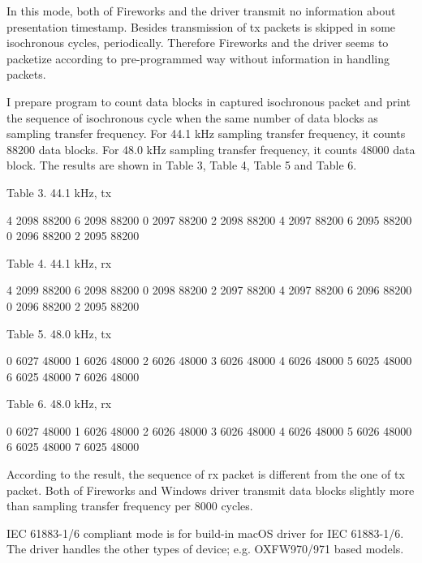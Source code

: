 In this mode, both of Fireworks and the driver transmit no information about presentation timestamp. Besides transmission of tx packets is skipped in some isochronous cycles, periodically. Therefore Fireworks and the driver seems to packetize according to pre-programmed way without information in handling packets.

I prepare program to count data blocks in captured isochronous packet and print the sequence of isochronous cycle when the same number of data blocks as sampling transfer frequency. For 44.1 kHz sampling transfer frequency, it counts 88200 data blocks. For 48.0 kHz sampling transfer frequency, it counts 48000 data block. The results are shown in Table 3, Table 4, Table 5 and Table 6.

Table 3. 44.1 kHz, tx

4 2098 88200
6 2098 88200
0 2097 88200
2 2098 88200
4 2097 88200
6 2095 88200
0 2096 88200
2 2095 88200

Table 4. 44.1 kHz, rx

4 2099 88200
6 2098 88200
0 2098 88200
2 2097 88200
4 2097 88200
6 2096 88200
0 2096 88200
2 2095 88200

Table 5. 48.0 kHz, tx

0 6027 48000
1 6026 48000
2 6026 48000
3 6026 48000
4 6026 48000
5 6025 48000
6 6025 48000
7 6026 48000

Table 6. 48.0 kHz, rx

0 6027 48000
1 6026 48000
2 6026 48000
3 6026 48000
4 6026 48000
5 6026 48000
6 6025 48000
7 6025 48000

According to the result, the sequence of rx packet is different from the one of tx packet. Both of Fireworks and Windows driver transmit data blocks slightly more than sampling transfer frequency per 8000 cycles.

IEC 61883-1/6 compliant mode is for build-in macOS driver for IEC 61883-1/6. The driver handles the other types of device; e.g. OXFW970/971 based models.

